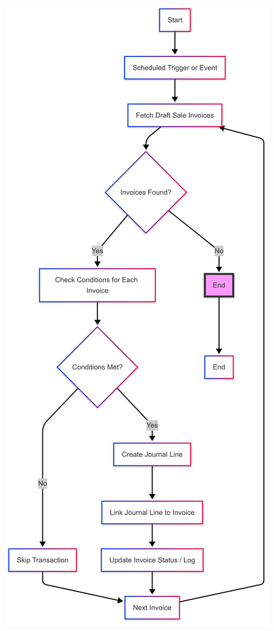 \documentclass[11pt,a4paper]{article}
\begin{document}
\begin{minipage}{0.45\textwidth}
    \centering
    \includegraphics[width=\linewidth]{diagram/autoposting.png}
\end{minipage}
\end{document}
